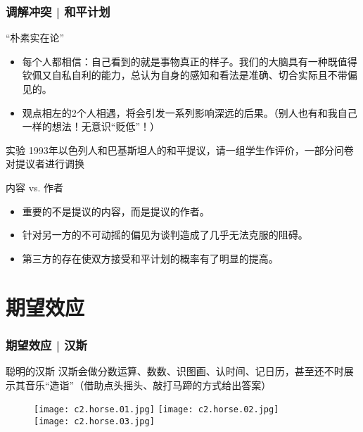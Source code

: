 \begin{frame}
  \frametitle{调解冲突 | 和平计划}
  \begin{block}{“朴素实在论”}
    \begin{itemize}
      \item 每个人都相信：自己看到的就是事物真正的样子。我们的大脑具有一种既值得钦佩又自私自利的能力，总认为自身的感知和看法是准确、切合实际且不带偏见的。
      \item 观点相左的2个人相遇，将会引发一系列影响深远的后果。（别人也有和我自己一样的想法！无意识“贬低”！）
    \end{itemize}
  \end{block}
  \vspace{-0.5em}
  \pause
  \begin{block}{实验}
    1993年以色列人和巴基斯坦人的和平提议，请一组学生作评价，一部分问卷对提议者进行调换
  \end{block}
  \vspace{-0.5em}
  \pause
  \begin{block}{内容 vs. 作者}
    \begin{itemize}
      \item 重要的不是提议的内容，而是提议的作者。
      \item 针对另一方的不可动摇的偏见为谈判造成了几乎无法克服的阻碍。
      \item 第三方的存在使双方接受和平计划的概率有了明显的提高。
    \end{itemize}
  \end{block}
\end{frame}

\section{期望效应}
\begin{frame}
  \frametitle{期望效应 | 汉斯}
  \begin{block}{聪明的汉斯}
汉斯会做分数运算、数数、识图画、认时间、记日历，甚至还不时展示其音乐“造诣”（借助点头摇头、敲打马蹄的方式给出答案）
\vspace{-1em}
\begin{figure}
  \centering
  \texttt{[image: c2.horse.01.jpg]}\quad
  \texttt{[image: c2.horse.02.jpg]}\\
  \texttt{[image: c2.horse.03.jpg]}
\end{figure}
  \end{block}
\end{frame}

